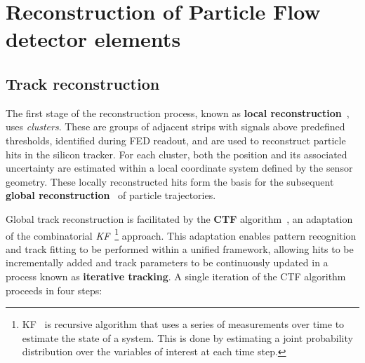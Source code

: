 \section{Reconstruction of Particle Flow detector elements}
\label{Section:Chapter4_Reconstruction_of_PF_elements}
\subsection{Track reconstruction}
The first stage of the reconstruction process, known as \textbf{local reconstruction}~\cite{CMS_TrackerPerformance_2014,CMS_Track_Reconstruction_Run2_3}, uses \textit{clusters}. These are groups of adjacent strips with signals above predefined thresholds, identified during \ac{FED} readout, and are used to reconstruct particle hits in the silicon tracker. For each cluster, both the position and its associated uncertainty are estimated within a local coordinate system defined by the sensor geometry. These locally reconstructed hits form the basis for the subsequent \textbf{global reconstruction}~\cite{CMS_TrackerPerformance_2014,CMS_Track_Reconstruction_Run2_3} of particle trajectories.

Global track reconstruction is facilitated by the \textbf{\ac{CTF}} algorithm~\cite{CMS_TrackerPerformance_2014,CMS_Track_Reconstruction_Run2_3}, an adaptation of the combinatorial \textit{\ac{KF}}~\cite{KF_1,KF_2,KF_3}\footnote{KF~\cite{KF_4} is recursive algorithm that uses a series of measurements over time to estimate the state of a system. This is done by estimating a joint probability distribution over the variables of interest at each time step.} approach. This adaptation enables pattern recognition and track fitting to be performed within a unified framework, allowing hits to be incrementally added and track parameters to be continuously updated in a process known as \textbf{iterative tracking}. A single iteration of the CTF algorithm proceeds in four steps:

